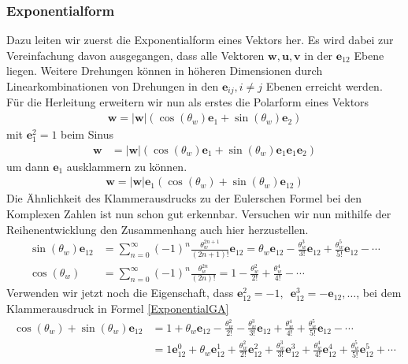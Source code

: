 \subsubsection{Exponentialform}
Dazu leiten wir zuerst die Exponentialform eines Vektors her. Es wird dabei zur Vereinfachung davon ausgegangen, dass alle Vektoren $\mathbf{w}, \mathbf{u}, \mathbf{v}$ in der $\mathbf{e}_{12}$ Ebene liegen. Weitere Drehungen können in höheren Dimensionen durch Linearkombinationen von Drehungen in den $\mathbf{e}_{ij}, i\not=j$ Ebenen erreicht werden. Für die Herleitung erweitern wir nun als erstes die Polarform eines Vektors
\begin{align}
	\mathbf{w} = |\mathbf{w}| \left(\cos(\theta_w) \mathbf{e}_1 + \sin(\theta_w) \mathbf{e}_2\right)
\end{align}
mit $\mathbf{e}_1^2 = 1$ beim Sinus
\begin{align}\label{e1ausklammern}
	\mathbf{w} &= |\mathbf{w}| \left(\cos(\theta_w) \mathbf{e}_1 + \sin(\theta_w) \mathbf{e}_1\mathbf{e}_1\mathbf{e}_2\right) 
\end{align}
um dann $\mathbf{e}_1$ ausklammern zu können. 
\begin{align}
	\mathbf{w} = |\mathbf{w}|\mathbf{e}_1\left(\cos(\theta_w)+ \sin(\theta_w) \mathbf{e}_{12}\right) \label{ExponentialGA}
\end{align}
Die Ähnlichkeit des Klammerausdrucks zu der Eulerschen Formel bei den Komplexen Zahlen ist nun schon gut erkennbar. Versuchen wir nun mithilfe der Reihenentwicklung den Zusammenhang auch hier herzustellen.
\begin{align}
	\sin(\theta_w)\mathbf{e}_{12}&=\sum _{n=0}^{\infty }(-1)^{n}{\frac {\theta_w^{2n+1}}{(2n+1)!}}\mathbf{e}_{12} =\theta_w\mathbf{e}_{12}-{\frac {\theta_w^{3}}{3!}}\mathbf{e}_{12}+{\frac {\theta_w^{5}}{5!}}\mathbf{e}_{12}-\cdots \\
	\cos(\theta_w)&=\sum _{n=0}^{\infty }(-1)^{n}{\frac {\theta_w^{2n}}{(2n)!}} =1-{\frac {\theta_w^{2}}{2!}}+{\frac {\theta_w^{4}}{4!}}-\cdots
\end{align}
Verwenden wir jetzt noch die Eigenschaft, dass $\mathbf{e}_{12}^2=-1, \enspace\mathbf{e}_{12}^3=-\mathbf{e}_{12}, \dots$, bei dem Klammerausdruck in Formel \eqref{ExponentialGA}
\begin{align}
	\cos(\theta_w)+ \sin(\theta_w) \mathbf{e}_{12} &= 1+\theta_w\mathbf{e}_{12}-{\frac {\theta_w^{2}}{2!}}-{\frac {\theta_w^{3}}{3!}}\mathbf{e}_{12}+{\frac {\theta_w^{4}}{4!}}+{\frac {\theta_w^{5}}{5!}}\mathbf{e}_{12}-\cdots\\
	&= 1 \mathbf{e}_{12}^0+\theta_w\mathbf{e}_{12}^1+{\frac {\theta_w^{2}}{2!}}\mathbf{e}_{12}^2+{\frac {\theta_w^{3}}{3!}}\mathbf{e}_{12}^3+{\frac {\theta_w^{4}}{4!}}\mathbf{e}_{12}^4+{\frac {\theta_w^{5}}{5!}}\mathbf{e}_{12}^5+\cdots
	\label{ExponentialGA2}
\end{align}
